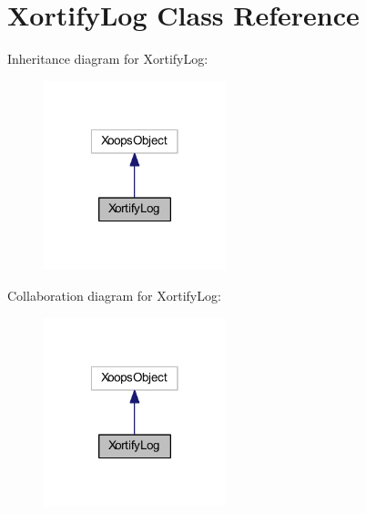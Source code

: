 \hypertarget{class_xortify_log}{\section{Xortify\-Log Class Reference}
\label{class_xortify_log}
}


Inheritance diagram for Xortify\-Log\-:
\nopagebreak
\begin{figure}[H]
\begin{center}
\leavevmode
\includegraphics[width=150pt]{class_xortify_log__inherit__graph}
\end{center}
\end{figure}


Collaboration diagram for Xortify\-Log\-:
\nopagebreak
\begin{figure}[H]
\begin{center}
\leavevmode
\includegraphics[width=150pt]{class_xortify_log__coll__graph}
\end{center}
\end{figure}
